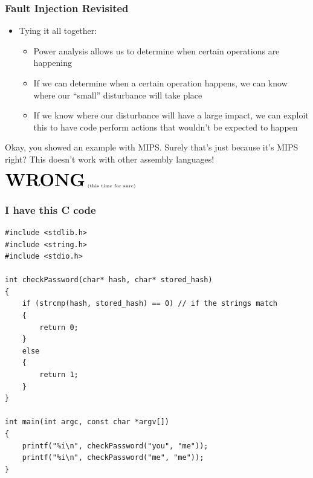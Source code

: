 \documentclass{beamer}
\begin{document}
\begin{frame}[t]
\frametitle{Fault Injection Revisited}
\begin{itemize}
\item Tying it all together:
    \begin{itemize}
    \item Power analysis allows us to determine when certain operations are happening
    \item If we can determine when a certain operation happens, we can know where our ``small'' disturbance will take place
    \item If we know where our disturbance will have a large impact, we can exploit this to have code perform actions that wouldn't be expected to happen
    \end{itemize}
\end{itemize}
\end{frame}

\begin{frame}
    \begin{center}Okay, you showed an example with MIPS.
    Surely that's just because it's MIPS right?
    This doesn't work with other assembly languages!
    \end{center}
\end{frame}

\begin{frame}
    \begin{center}$\textbf{\huge{WRONG}}_\text{ \tiny{(this time for sure)}}$\end{center}
\end{frame}

\begin{frame}[fragile]
\frametitle{I have this C code}
\lstset{language=C}
\lstset{lineskip=-2.75pt}
\begin{lstlisting}
#include <stdlib.h>
#include <string.h>
#include <stdio.h>

int checkPassword(char* hash, char* stored_hash)
{
    if (strcmp(hash, stored_hash) == 0) // if the strings match
    {
        return 0;
    }
    else
    {
        return 1;
    }
}

int main(int argc, const char *argv[])
{
    printf("%i\n", checkPassword("you", "me"));
    printf("%i\n", checkPassword("me", "me"));
}
\end{lstlisting}
\end{frame}
\end{document}
